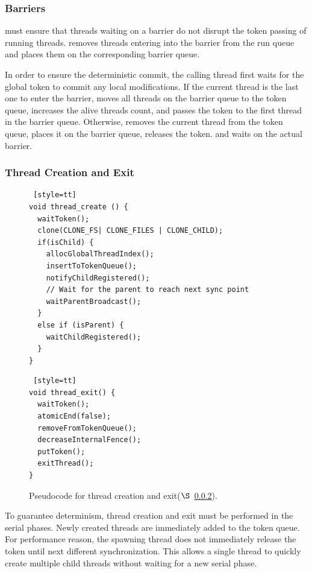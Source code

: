 \subsubsection{Barriers}

\label{sec:barrierwait}

\dthreads{} must ensure that threads waiting on a barrier do not disrupt the token passing of running threads. \dthreads{} removes threads entering into the barrier from the run queue and places them on the corresponding barrier queue.

In order to ensure the deterministic commit, the calling thread first waits for the global token to commit any local modifications. If the current thread is the last one to enter the barrier, \dthreads{} moves all threads on the barrier queue to the token queue, increases the alive threads count, and passes the token to the first thread in the barrier queue.  Otherwise, \dthreads{} removes the current thread from the token queue, places it on the barrier queue, releases the token. and waits on the actual barrier.


\subsubsection{Thread Creation and Exit}

\label{sec:threadcreation}

\begin{figure}
\begin{lstlisting} [style=tt]
void thread_create () {
  waitToken();
  clone(CLONE_FS| CLONE_FILES | CLONE_CHILD);
  if(isChild) {
    allocGlobalThreadIndex();
    insertToTokenQueue();
	notifyChildRegistered();
	// Wait for the parent to reach next sync point
    waitParentBroadcast();	
  }
  else if (isParent) {
    waitChildRegistered();
  }
}
\end{lstlisting}
\begin{lstlisting} [style=tt]
void thread_exit() {
  waitToken();
  atomicEnd(false);
  removeFromTokenQueue();
  decreaseInternalFence();
  putToken();
  exitThread(); 
}
\end{lstlisting}
\caption{Pseudocode for thread creation and exit($\S$~\ref{sec:threadcreation}).
\label{fig:threadcreation}
}
\end{figure}

To guarantee determinism, thread creation and exit must be performed in the serial phases.  Newly created threads are immediately added to the token queue.  For performance reason, the spawning thread does not immediately release the token until next different synchronization. This allows a single thread to quickly create multiple child threads without waiting for a new serial phase.

